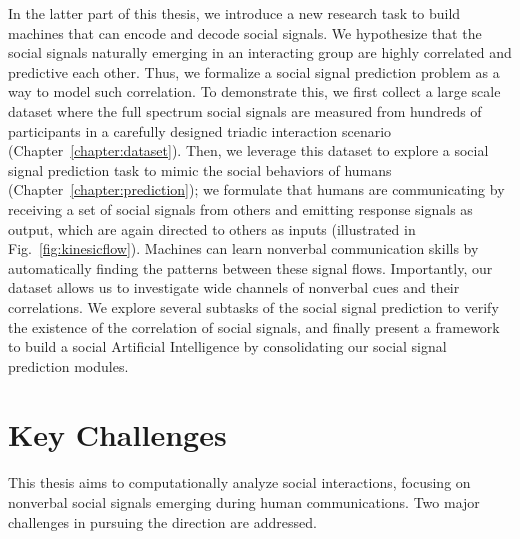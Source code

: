 In the latter part of this thesis, we introduce a new research task to build machines that can encode and decode social signals. We hypothesize that the social signals naturally emerging in an interacting group are highly correlated and predictive each other. Thus, we formalize a social signal prediction problem as a way to model such correlation. To demonstrate this, we first collect a large scale dataset where the full spectrum social signals are measured from hundreds of participants in a carefully designed triadic interaction scenario (Chapter~\ref{chapter:dataset}). Then, we leverage this dataset to explore a social signal prediction task to mimic the social behaviors of humans (Chapter~\ref{chapter:prediction}); we formulate that humans are communicating by receiving a set of social signals from others and emitting response signals as output, which are again directed to others as inputs (illustrated in Fig.~\ref{fig:kinesicflow}). Machines can learn nonverbal communication skills by automatically finding the patterns between these signal flows. Importantly, our dataset allows us to investigate wide channels of nonverbal cues and their correlations. We explore several subtasks of the social signal prediction to verify the existence of the correlation of social signals, and finally present a framework to build a social Artificial Intelligence by consolidating our social signal prediction modules. 


\section{Key Challenges}
This thesis aims to computationally analyze social interactions, focusing on nonverbal social signals emerging during human communications. Two major challenges in pursuing the direction are addressed.

